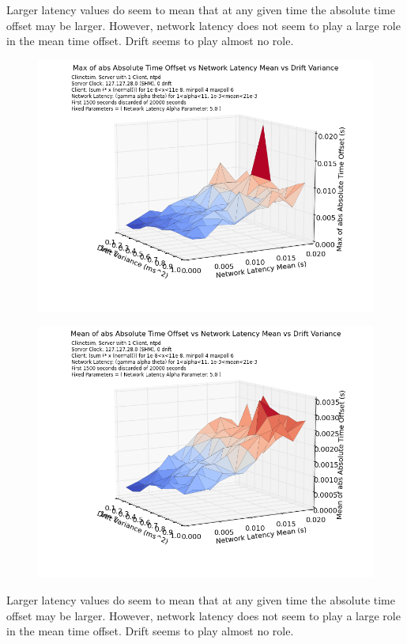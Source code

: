 Larger latency values do seem to mean that at any given time the
absolute time offset may be larger. However, network latency does not
seem to play a large role in the mean time offset. Drift seems to play
almost no role.


\begin{figure}[h]
  \includegraphics[width=0.8\linewidth]{max_abs_time-latency_mean-drift_var.png}
\end{figure}

\begin{figure}[h]
  \includegraphics[width=0.8\linewidth]{mean_abs_time-mean_latency-drift_var.png}
\end{figure}

Larger latency values do seem to mean that at any given time the
absolute time offset may be larger. However, network latency does not
seem to play a large role in the mean time offset. Drift seems to play
almost no role.



